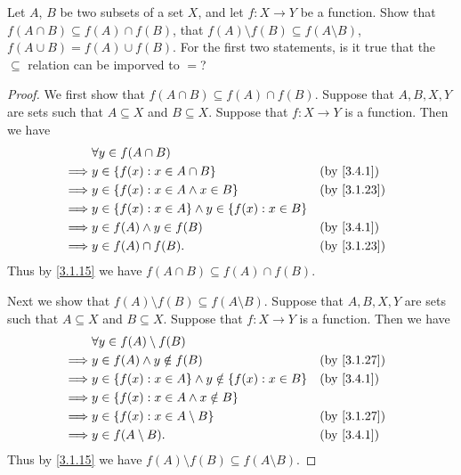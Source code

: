 \begin{ex}\label{ex:3.4.3}
  Let \(A\), \(B\) be two subsets of a set \(X\), and let \(f : X \to Y\) be a function.
  Show that \(f(A \cap B) \subseteq f(A) \cap f(B)\), that \(f(A) \setminus f(B) \subseteq f(A \setminus B)\), \(f(A \cup B) = f(A) \cup f(B)\).
  For the first two statements, is it true that the \(\subseteq\) relation can be imporved to \(=\)?
\end{ex}

\begin{proof}
  We first show that \(f(A \cap B) \subseteq f(A) \cap f(B)\).
  Suppose that \(A, B, X, Y\) are sets such that \(A \subseteq X\) and \(B \subseteq X\).
  Suppose that \(f : X \to Y\) is a function.
  Then we have
  \begin{align*}
             & \forall y \in f(A \cap B)                                                              \\
    \implies & y \in \{f(x) : x \in A \cap B\}                         &  & \text{(by \cref{3.4.1})}  \\
    \implies & y \in \{f(x) : x \in A \land x \in B\}                  &  & \text{(by \cref{3.1.23})} \\
    \implies & y \in \{f(x) : x \in A\} \land y \in \{f(x) : x \in B\}                                \\
    \implies & y \in f(A) \land y \in f(B)                             &  & \text{(by \cref{3.4.1})}  \\
    \implies & y \in f(A) \cap f(B).                                   &  & \text{(by \cref{3.1.23})}
  \end{align*}
  Thus by \cref{3.1.15} we have \(f(A \cap B) \subseteq f(A) \cap f(B)\).

  Next we show that \(f(A) \setminus f(B) \subseteq f(A \setminus B)\).
  Suppose that \(A, B, X, Y\) are sets such that \(A \subseteq X\) and \(B \subseteq X\).
  Suppose that \(f : X \to Y\) is a function.
  Then we have
  \begin{align*}
             & \forall y \in f(A) \setminus f(B)                                                         \\
    \implies & y \in f(A) \land y \notin f(B)                             &  & \text{(by \cref{3.1.27})} \\
    \implies & y \in \{f(x) : x \in A\} \land y \notin \{f(x) : x \in B\} &  & \text{(by \cref{3.4.1})}  \\
    \implies & y \in \{f(x) : x \in A \land x \notin B\}                                                 \\
    \implies & y \in \{f(x) : x \in A \setminus B\}                       &  & \text{(by \cref{3.1.27})} \\
    \implies & y \in f(A \setminus B).                                    &  & \text{(by \cref{3.4.1})}
  \end{align*}
  Thus by \cref{3.1.15} we have \(f(A) \setminus f(B) \subseteq f(A \setminus B)\).


\end{proof}
